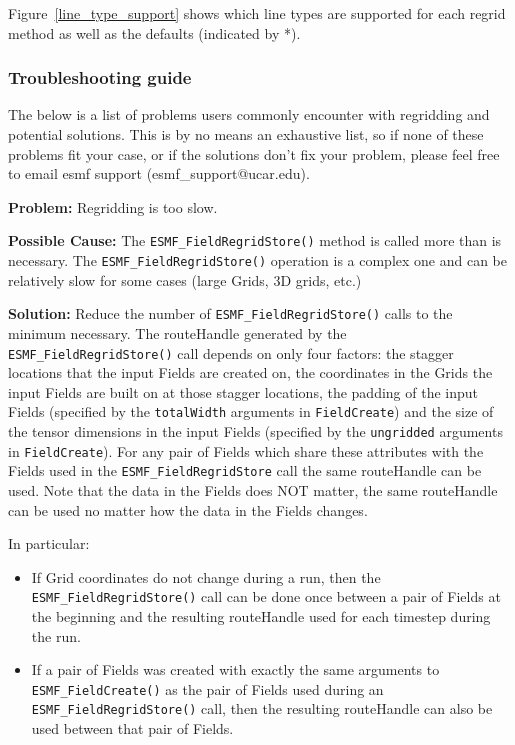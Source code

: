 Figure~\ref{line_type_support} shows which line types are supported for each regrid method as well as the defaults (indicated by *). 

\subsubsection{Troubleshooting guide}

 The below is a list of problems users commonly encounter with regridding and potential solutions. 
 This is by no means an exhaustive list, so if none of these problems fit your case, or if the solutions
 don't fix your problem, please feel free to email esmf support (esmf\_support@ucar.edu).

 \bigskip
 
 {\bf Problem:} Regridding is too slow.

 \medskip

 {\bf Possible Cause:} The {\tt ESMF\_FieldRegridStore()} method is called more than is necessary. \newline
 The {\tt ESMF\_FieldRegridStore()} operation is a complex one and can be 
 relatively slow for some cases (large Grids, 3D grids, etc.) 
 
 \smallskip

 {\bf Solution:} Reduce the number of {\tt ESMF\_FieldRegridStore()} calls to the minimum necessary. The
 routeHandle generated by the {\tt ESMF\_FieldRegridStore()} call depends on only four factors: the 
 stagger locations that the input Fields are created on, the coordinates in the Grids the input Fields
 are built on at those stagger locations, the padding of the input Fields 
 (specified by the {\tt totalWidth} arguments in {\tt FieldCreate}) and the size of the tensor
 dimensions in the input Fields (specified by the {\tt ungridded} arguments in {\tt FieldCreate}). 
 For any pair of Fields which share these attributes with the Fields used in the
 {\tt ESMF\_FieldRegridStore} call  the same routeHandle can be used. Note that the data in the 
 Fields does NOT matter, the same routeHandle can be used no matter how the data in the Fields changes.

 \smallskip

 In particular:
 \begin{itemize}

 \item If Grid coordinates do not change during a run, then the {\tt ESMF\_FieldRegridStore()} call can be
 done once between a pair of Fields at the beginning and the resulting routeHandle used for each 
 timestep during the run. 

 \item If a pair of Fields was created with exactly the same arguments to {\tt ESMF\_FieldCreate()} as the 
 pair of Fields used during an {\tt ESMF\_FieldRegridStore()} call, then the resulting routeHandle can 
 also be used between that pair of Fields. 
 \end{itemize}

